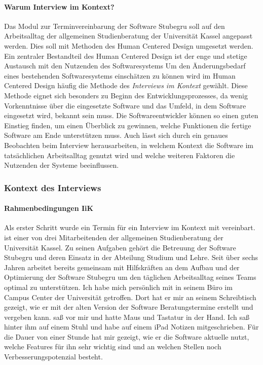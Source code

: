 \paragraph{Warum Interview im Kontext?}
Das Modul zur Terminvereinbarung der Software Stubegru soll auf den
Arbeitsalltag der allgemeinen Studienberatung der Universität Kassel angepasst
werden. Dies soll mit Methoden des Human Centered Design umgesetzt werden. Ein
zentraler Bestandteil des Human Centered Design ist der enge und stetige
Austausch mit den Nutzenden des Softwaresystems \cite{hci}  Um den Änderungsbedarf eines bestehenden Softwaresystems einschätzen
zu können wird im Human Centered Design häufig die Methode des
\textit{Interviews im Kontext} gewählt.\cite{contextualDesign} Diese Methode
eignet sich besonders zu Beginn des Entwicklungsprozesses, da wenig
Vorkenntnisse über die eingesetzte Software und das Umfeld, in dem Software
eingesetzt wird, bekannt sein muss. Die Softwareentwickler können so einen
guten Einstieg finden, um einen Überblick zu gewinnen, welche Funktionen die
fertige Software am Ende unterstützen muss. Auch lässt sich durch ein genaues
Beobachten beim Interview herausarbeiten, in welchem Kontext die Software im
tatsächlichen Arbeitsalltag genutzt wird und welche weiteren Faktoren die
Nutzenden der Systeme beeinflussen.

\subsubsection{Kontext des Interviews}

\paragraph{Rahmenbedingungen IiK}
Als erster Schritt wurde ein Termin für ein Interview im Kontext mit \ipName
{} vereinbart. \ipName ist einer von drei
Mitarbeitenden der allgemeinen Studienberatung der Universität Kassel. Zu
seinen Aufgaben gehört die Betreuung der Software Stubegru und deren Einsatz in
der Abteilung Studium und Lehre. Seit über sechs Jahren arbeitet \ipName
bereits gemeinsam mit Hilfskräften an dem Aufbau und der Optimierung der
Software Stubegru um den täglichen Arbeitsalltag seines Teams optimal zu
unterstützen. Ich habe mich persönlich mit \ipName in seinem Büro im Campus
Center der Universität getroffen. Dort hat er mir an seinem Schreibtisch
gezeigt, wie er mit der alten Version der Software Beratungstermine erstellt
und vergeben kann. \ipName saß vor mir und hatte Maus und Tastatur in der Hand.
Ich saß hinter ihm auf einem Stuhl und habe auf einem iPad Notizen
mitgeschrieben. Für die Dauer von einer Stunde hat \ipName mir gezeigt, wie er
die Software aktuelle nutzt, welche Features für ihn sehr wichtig sind und an
welchen Stellen noch Verbesserungspotenzial besteht.

